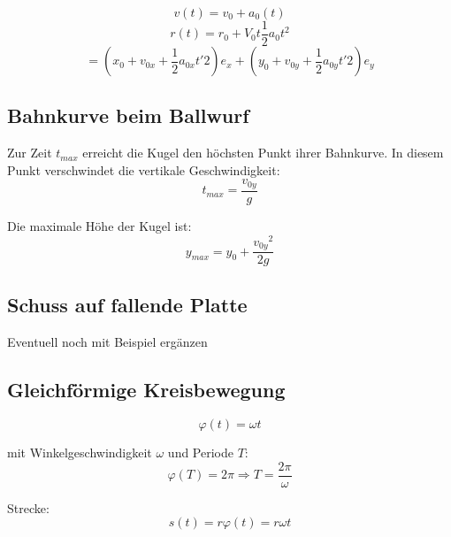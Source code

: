 \documentclass[7pt]{article}
\begin{document}
\begin{multicols}{3}
\begin{equation*}
	v(t) = v_0 + a_0(t)
\end{equation*}
\begin{equation*}
r(t) = r_0 + V_0t \frac{1}{2}a_0t^2 
\end{equation*}
\begin{equation*}
	= \left(x_0 + v_{0x} + \frac{1}{2}a_{0x}t'2\right)e_x + \left(y_0 + v_{0y} + \frac{1}{2}a_{0y}t'2\right)e_y
\end{equation*}
\newline

\subsection{Bahnkurve beim Ballwurf}

Zur Zeit $t_{max}$ erreicht die Kugel den h{\"o}chsten Punkt ihrer Bahnkurve. In diesem Punkt verschwindet die vertikale Geschwindigkeit:
\begin{equation*}
	t_{max} = \frac{v_{0y}}{g}
\end{equation*}
\columnbreak
\newline

Die maximale H{\"o}he der Kugel ist:
\begin{equation*}
	y_{max} = y_0 + \frac{{v_{0y}}^2}{2g}
\end{equation*}



\subsection{Schuss auf fallende Platte}
Eventuell noch mit Beispiel ergänzen


\subsection{Gleichf{\"o}rmige Kreisbewegung}

\begin{equation*}
	\varphi(t) = \omega t
\end{equation*}

mit Winkelgeschwindigkeit $\omega$ und Periode $T$:
\begin{equation*}
	\varphi(T) = 2 \pi \Rightarrow T = \frac{2 \pi}{\omega}
\end{equation*}

Strecke:\newline
\begin{equation*}
	s(t) = r\varphi(t) = r \omega t 
\end{equation*}


\end{multicols}
\end{document}

